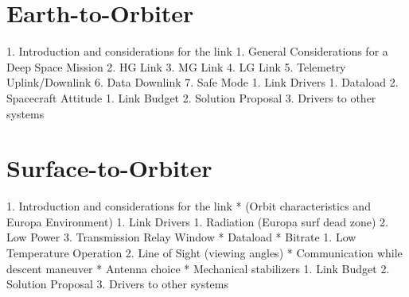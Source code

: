 \section{Earth-to-Orbiter} %

1. Introduction and considerations for the link
   1. General Considerations for a Deep Space Mission
   2. HG Link
   3. MG Link
   4. LG Link
   5. Telemetry Uplink/Downlink
   6. Data Downlink
   7. Safe Mode
1. Link Drivers
   1. Dataload
   2. Spacecraft Attitude
1. Link Budget
2. Solution Proposal
3. Drivers to other systems



\section{Surface-to-Orbiter} %

1. Introduction and considerations for the link
      * (Orbit characteristics and Europa Environment)
1. Link Drivers
   1. Radiation (Europa surf dead zone)
   2. Low Power
   3. Transmission Relay Window
      * Dataload
      * Bitrate
   1. Low Temperature Operation
   2. Line of Sight (viewing angles)
      * Communication while descent maneuver
      * Antenna choice
      * Mechanical stabilizers
1. Link Budget
2. Solution Proposal
3. Drivers to other systems